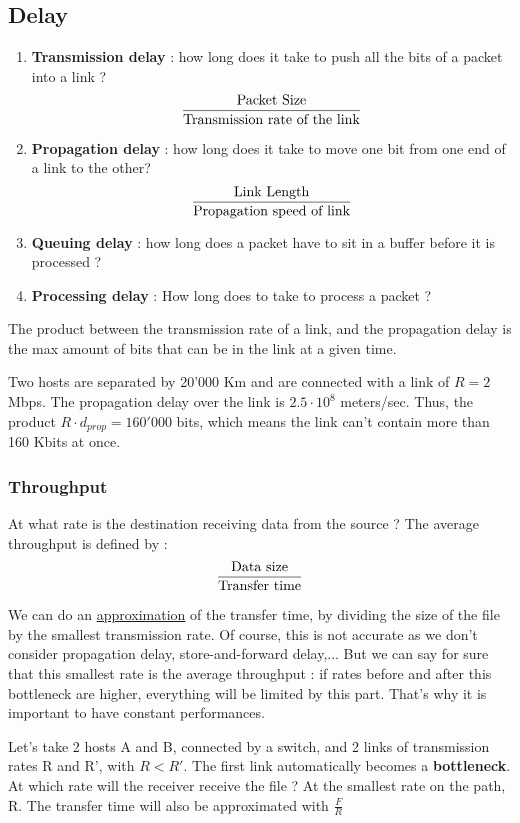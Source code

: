 \documentclass[12pt,a4paper]{article}
\begin{document}
\subsection{Delay}
\begin{enumerate}
	\item 	\textbf{Transmission delay} : how long does it take to push all the bits of a packet into a link ? 
			\begin{equation}
				\frac{\text{Packet Size}}{\text{Transmission rate of the link}}
				\label{eq: transmission delay}
			\end{equation}						
	\item 	\textbf{Propagation delay} : how long does it take to move one bit from one end of a link to the other? 
			\begin{equation}			
				\frac{\text{Link Length}}{\text{Propagation speed of link}}
				\label{eq: propagation delay}
			\end{equation}
	\item 	\textbf{Queuing delay} : how long does a packet have to sit in a buffer before it is processed ? 
	\item 	\textbf{Processing delay} : How long does to take to process a packet ?
\end{enumerate}
 The product between the transmission rate of a link, and the propagation delay is the max amount of bits that can be in the link at a given time. 
\begin{exemple}
	Two hosts are separated by 20'000 Km and are connected with a link of $R = 2$ Mbps. The propagation delay over the link is $2.5 \cdot 10^8$ meters/sec. Thus, the product $R\cdot d_{prop} = 160'000$ bits, which means the link can't contain more than 160 Kbits at once. 
\end{exemple}

\subsubsection{Throughput}
At what rate is the destination receiving data from the source ? The average throughput is defined by :
\begin{equation}
	\frac{\text{Data size}}{\text{Transfer time}}
\end{equation}

We can do an \uline{approximation}  of the transfer time, by dividing the size of the file by the smallest transmission rate. Of course, this is not accurate as we don't consider propagation delay, store-and-forward delay,... But we can say for sure that this smallest rate is the average throughput : if rates before and after this bottleneck are higher, everything will be limited by this part. That's why it is important to have constant performances.
\begin{exemple}
	Let's take 2 hosts A and B, connected by a switch, and 2 links of transmission rates R and R', with $R  < R'$. The first link automatically becomes a \textbf{bottleneck}. At which rate will the receiver receive the file ? At the smallest rate on the path, R. The transfer time will also be approximated with $\frac{F}{R}$
\end{exemple}
\end{document}
